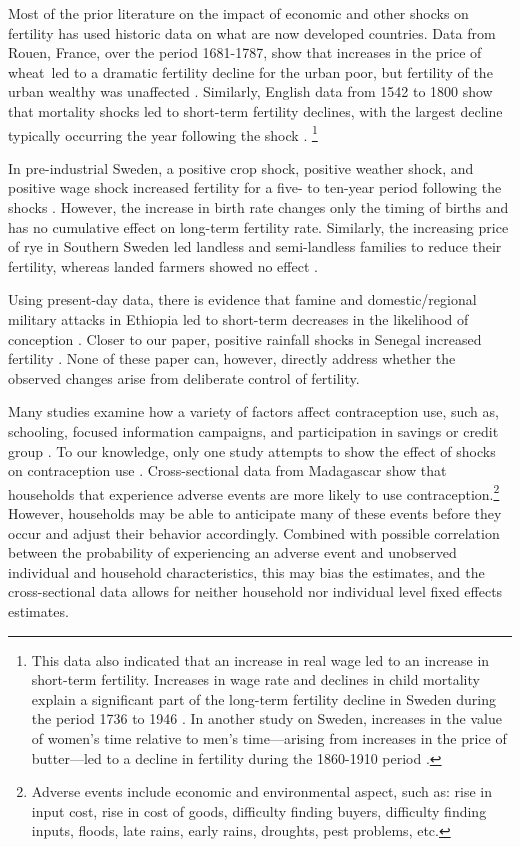 \documentclass[letterpaper,12pt]{article}
\begin{document}
Most of the prior literature on the impact of economic and other shocks on fertility has
used historic data on what are now developed countries.
Data from Rouen, France, over the period 1681-1787, show that increases in the
price of wheat led to a dramatic fertility decline for the urban poor, 
but fertility of the urban wealthy was unaffected \citep{Galloway1987}.
Similarly, English data from 1542 to 1800 show that mortality shocks led to short-term
fertility declines, with the largest decline typically occurring  the year following 
the shock \citep{Bailey1998}.%
\footnote{
This data also indicated that an increase in real wage led to an increase in short-term 
fertility.
Increases in wage rate and declines in child mortality explain a significant part of the 
long-term fertility decline in Sweden during the period 1736 to 1946 \citep{Eckstein1999a}.
In another study on Sweden, increases in the value of women's time relative to men's 
time---arising from increases in the price of butter---led to a decline in fertility during 
the  1860-1910 period \citep{Schultz1985}. 
}

In pre-industrial Sweden, a positive crop shock, positive weather shock, and positive wage 
shock increased fertility for a five- to ten-year period following the shocks \citep{Eckstein1985}.
However, the increase in birth rate changes only the timing of births and has no cumulative 
effect on long-term fertility rate.
Similarly, the increasing price of rye in Southern Sweden led landless and semi-landless 
families to reduce their fertility, whereas landed farmers showed no effect 
\citep{bengtsson06}.

Using present-day data, there is evidence that famine and domestic/regional military
attacks in Ethiopia led to short-term decreases in the likelihood of conception
\citep{lindstrom99}.
Closer to our paper, positive rainfall shocks in Senegal increased 
fertility \citep{pitt98b}.
None of these paper can, however, directly address whether the observed changes 
arise from deliberate control of fertility.

Many studies examine how a variety of factors affect contraception use, such 
as, 
schooling, 
focused information campaigns, and
participation in savings or credit group 
\citep{Ainsworth1996,Feyisetan1996,Steele2001,Chen2003}.
To our knowledge, only one study attempts to show the effect of shocks on 
contraception use \citep{Hernandez-Correa2010}. 
Cross-sectional data from Madagascar show that households that experience adverse events 
are more likely to use contraception.\footnote{%
Adverse events include economic and environmental aspect, such as: rise in input 
cost, rise in cost of goods, difficulty finding buyers, difficulty finding inputs, 
floods, late rains, early rains, droughts, pest problems, etc. 
} 
However, households may be able to anticipate many of these events before they 
occur and adjust their behavior accordingly.
Combined with possible correlation between the probability of
experiencing an adverse event and unobserved individual and household
characteristics, this may bias the estimates, and the cross-sectional
data allows for neither household nor individual level fixed effects
estimates.
\end{document}
